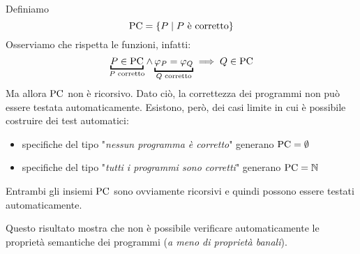 Definiamo
$$ \text{PC} = \left\{P \mid P \text{ è corretto}\right\}$$
Osserviamo che rispetta le funzioni, infatti:
$$ \underbracket{P \in \pc}_{P \text{ corretto}} \wedge \underbracket{\varphi_P = \varphi_Q}_{Q \text{ corretto}} \implies Q \in \pc $$
Ma allora $\text{PC}$ non è ricorsivo. Dato ciò, la correttezza dei programmi non può essere testata automaticamente. Esistono, però, dei casi limite in cui è possibile costruire dei test automatici:
\begin{itemize}
	\item specifiche del tipo "\textit{nessun programma è corretto}" generano $\text{PC} = \emptyset$
	\item specifiche del tipo "\textit{tutti i programmi sono corretti}" generano $\text{PC} = \mathbb{N}$
\end{itemize}

Entrambi gli insiemi $\text{PC}$ sono ovviamente ricorsivi e quindi possono essere testati automaticamente.

Questo risultato mostra che non è possibile verificare automaticamente le proprietà semantiche dei programmi (\textit{a meno di proprietà banali}).

